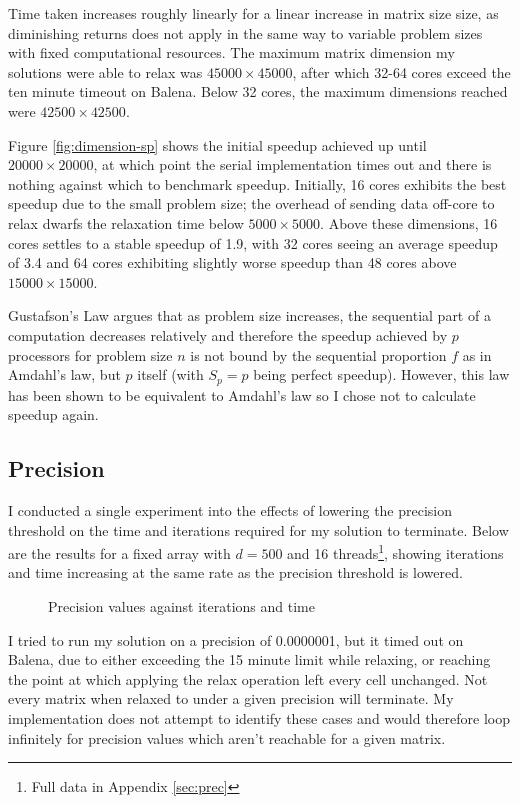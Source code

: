 \documentclass[12pt]{article}
\begin{document}
Time taken increases roughly linearly for a linear increase in matrix size size, as diminishing returns does not apply in the same way to variable problem sizes with fixed computational resources. The maximum matrix dimension my solutions were able to relax was $45000\times{}45000$, after which 32-64 cores exceed the ten minute timeout on Balena. Below 32 cores, the maximum dimensions reached were $42500\times{}42500$.

Figure \ref{fig:dimension-sp} shows the initial speedup achieved up until $20000\times{}20000$, at which point the serial implementation times out and there is nothing against which to benchmark speedup. Initially, 16 cores exhibits the best speedup due to the small problem size; the overhead of sending data off-core to relax dwarfs the relaxation time below $5000\times{}5000$. Above these dimensions, 16 cores settles to a stable speedup of 1.9, with 32 cores seeing an average speedup of 3.4 and 64 cores exhibiting slightly worse speedup than 48 cores above $15000\times{}15000$.

Gustafson's Law argues that as problem size increases, the sequential part of a computation decreases relatively and therefore the speedup achieved by $p$ processors for problem size $n$ is not bound by the sequential proportion $f$ as in Amdahl's law, but $p$ itself (with $S_p = p$ being perfect speedup). However, this law has been shown to be equivalent to Amdahl's law \citep{reevaluating} so I chose not to calculate speedup again.


\subsection{Precision}

I conducted a single experiment into the effects of lowering the precision threshold on the time and iterations required for my solution to terminate. Below are the results for a fixed array with $d=500$ and 16 threads\footnote{Full data in Appendix \ref{sec:prec}}, showing iterations and time increasing at the same rate as the precision threshold is lowered.

\begin{figure}[h!]
	\caption{Precision values against iterations and time}
	\label{fig:precision}
\end{figure}
I tried to run my solution on a precision of 0.0000001, but it timed out on Balena, due to either exceeding the 15 minute limit while relaxing, or reaching the point at which applying the relax operation left every cell unchanged. Not every matrix when relaxed to under a given precision will terminate. My implementation does not attempt to identify these cases and would therefore loop infinitely for precision values which aren't reachable for a given matrix.
\end{document}
